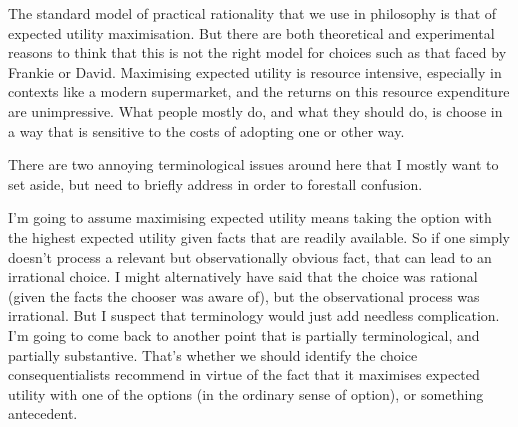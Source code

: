 \documentclass[
  11pt,
]{book}
\begin{document}
The standard model of practical rationality that we use in philosophy is that of expected utility maximisation. But there are both theoretical and experimental reasons to think that this is not the right model for choices such as that faced by Frankie or David. Maximising expected utility is resource intensive, especially in contexts like a modern supermarket, and the returns on this resource expenditure are unimpressive. What people mostly do, and what they should do, is choose in a way that is sensitive to the costs of adopting one or other way.

There are two annoying terminological issues around here that I mostly want to set aside, but need to briefly address in order to forestall confusion.

I'm going to assume maximising expected utility means taking the option with the highest expected utility given facts that are readily available. So if one simply doesn't process a relevant but observationally obvious fact, that can lead to an irrational choice. I might alternatively have said that the choice was rational (given the facts the chooser was aware of), but the observational process was irrational. But I suspect that terminology would just add needless complication. I'm going to come back to another point that is partially terminological, and partially substantive. That's whether we should identify the choice consequentialists recommend in virtue of the fact that it maximises expected utility with one of the options (in the ordinary sense of option), or something antecedent.
\end{document}
